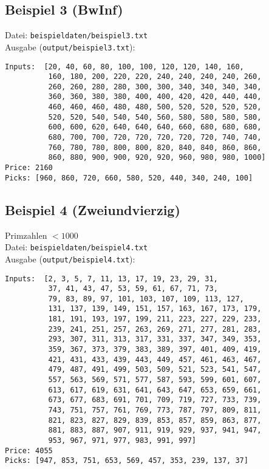 \documentclass[a4paper,10pt,ngerman]{scrartcl}
\begin{document}
\subsection{Beispiel 3 (BwInf)}
Datei: \texttt{beispieldaten/beispiel3.txt}\\
Ausgabe (\texttt{output/beispiel3.txt}):
\begin{verbatim}
Inputs:  [20, 40, 60, 80, 100, 100, 120, 120, 140, 160, 
          160, 180, 200, 220, 220, 240, 240, 240, 240, 260, 
          260, 260, 280, 280, 300, 300, 340, 340, 340, 340, 
          360, 360, 380, 380, 400, 400, 420, 420, 440, 440, 
          460, 460, 460, 480, 480, 500, 520, 520, 520, 520, 
          520, 520, 540, 540, 540, 560, 580, 580, 580, 580, 
          600, 600, 620, 640, 640, 640, 660, 680, 680, 680, 
          680, 700, 700, 720, 720, 720, 720, 720, 740, 740, 
          760, 780, 780, 800, 800, 820, 840, 840, 860, 860, 
          860, 880, 900, 900, 920, 920, 960, 980, 980, 1000]
Price: 2160
Picks: [960, 860, 720, 660, 580, 520, 440, 340, 240, 100]
\end{verbatim}
\subsection{Beispiel 4 (Zweiundvierzig)}
Primzahlen $< 1000$\\
Datei: \texttt{beispieldaten/beispiel4.txt}\\
Ausgabe (\texttt{output/beispiel4.txt}):
\begin{verbatim}
Inputs:  [2, 3, 5, 7, 11, 13, 17, 19, 23, 29, 31, 
          37, 41, 43, 47, 53, 59, 61, 67, 71, 73, 
          79, 83, 89, 97, 101, 103, 107, 109, 113, 127, 
          131, 137, 139, 149, 151, 157, 163, 167, 173, 179, 
          181, 191, 193, 197, 199, 211, 223, 227, 229, 233, 
          239, 241, 251, 257, 263, 269, 271, 277, 281, 283, 
          293, 307, 311, 313, 317, 331, 337, 347, 349, 353, 
          359, 367, 373, 379, 383, 389, 397, 401, 409, 419, 
          421, 431, 433, 439, 443, 449, 457, 461, 463, 467, 
          479, 487, 491, 499, 503, 509, 521, 523, 541, 547, 
          557, 563, 569, 571, 577, 587, 593, 599, 601, 607, 
          613, 617, 619, 631, 641, 643, 647, 653, 659, 661, 
          673, 677, 683, 691, 701, 709, 719, 727, 733, 739, 
          743, 751, 757, 761, 769, 773, 787, 797, 809, 811, 
          821, 823, 827, 829, 839, 853, 857, 859, 863, 877, 
          881, 883, 887, 907, 911, 919, 929, 937, 941, 947, 
          953, 967, 971, 977, 983, 991, 997]
Price: 4055
Picks: [947, 853, 751, 653, 569, 457, 353, 239, 137, 37]
\end{verbatim}
\end{document}
